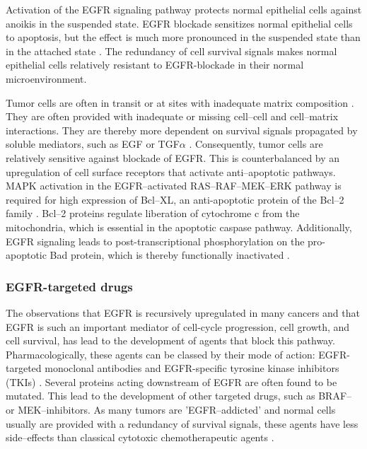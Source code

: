 {{      Activation of the EGFR signaling pathway protects normal epithelial
      cells against anoikis in the suspended state. EGFR blockade sensitizes
      normal epithelial cells to apoptosis, but the effect is much more
      pronounced in the suspended state than in the attached state {\cite{targeting_2}} {\cite{targeting_3}}. The
      redundancy of cell survival signals makes normal epithelial cells
      relatively resistant to EGFR-blockade in their normal microenvironment.

      Tumor cells are often in transit or at sites with inadequate matrix
      composition {\cite{targeting_4}}. They are often provided with inadequate or missing cell--cell
      and cell--matrix interactions. They are thereby more dependent on survival
      signals propagated by soluble mediators, such as EGF or TGF$\alpha$ {\cite{targeting}}.
      Consequently, tumor cells are relatively sensitive against blockade of
      EGFR. This is counterbalanced by an upregulation of cell surface receptors
      that activate anti--apoptotic pathways. MAPK activation in the
      EGFR--activated RAS--RAF--MEK--ERK pathway is required for high expression
      of Bcl--XL, an anti-apoptotic protein of the Bcl--2 family {\cite{targeting_5}}. Bcl--2
      proteins regulate liberation of cytochrome c from the mitochondria, which
      is essential in the apoptotic caspase pathway. Additionally, EGFR
      signaling leads to post-transcriptional phosphorylation on the
      pro-apoptotic Bad protein, which is thereby functionally inactivated {\cite{targeting_3}}.

    \subsubsection{EGFR-targeted drugs}

      The observations that EGFR is recursively upregulated in many cancers and
      that EGFR is such an important mediator of cell-cycle progression,  cell
      growth, and cell survival, has lead to the development of agents that
      block this pathway. Pharmacologically, these agents can be classed by
      their mode of action: EGFR-targeted monoclonal antibodies and
      EGFR-specific tyrosine kinase inhibitors (TKIs) {\cite{targeting}}. Several proteins acting
      downstream of EGFR are often found to be mutated. This lead to the
      development of other targeted drugs, such as BRAF-- or MEK--inhibitors.
      As many tumors are 'EGFR--addicted' and normal cells usually are provided
      with a redundancy of survival signals, these agents have less
      side--effects than classical cytotoxic chemotherapeutic agents {\cite{targeting}}.

}}
